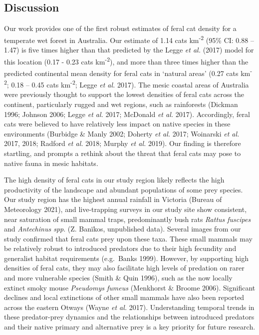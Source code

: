 \documentclass[11pt,a4paper,titlepage,twoside,openright]{style/unimelbthesis}
\begin{document}
\begin{mainmatter}
{\section{Discussion}\label{discussion}}

Our work provides one of the first robust estimates of feral cat density for a temperate wet forest in Australia. Our estimate of 1.14 cats km\textsuperscript{-2} (95\% CI: 0.88 -- 1.47) is five times higher than that predicted by the Legge \emph{et al.} (2017) model for this location (0.17 - 0.23 cats km\textsuperscript{-2}), and more than three times higher than the predicted continental mean density for feral cats in `natural areas' (0.27 cats km\textsuperscript{-2}; 0.18 -- 0.45 cats km\textsuperscript{-2}; Legge \emph{et al.} 2017). The mesic coastal areas of Australia were previously thought to support the lowest densities of feral cats across the continent, particularly rugged and wet regions, such as rainforests (Dickman 1996; Johnson 2006; Legge \emph{et al.} 2017; McDonald \emph{et al.} 2017). Accordingly, feral cats were believed to have relatively less impact on native species in these environments (Burbidge \& Manly 2002; Doherty \emph{et al.} 2017; Woinarski \emph{et al.} 2017, 2018; Radford \emph{et al.} 2018; Murphy \emph{et al.} 2019). Our finding is therefore startling, and prompts a rethink about the threat that feral cats may pose to native fauna in mesic habitats.

The high density of feral cats in our study region likely reflects the high productivity of the landscape and abundant populations of some prey species. Our study region has the highest annual rainfall in Victoria (Bureau of Meteorology 2021), and live-trapping surveys in our study site show consistent, near saturation of small mammal traps, predominantly bush rats \emph{Rattus fuscipes} and \emph{Antechinus spp}. (Z. Banïkos, unpublished data). Several images from our study confirmed that feral cats prey upon these taxa. These small mammals may be relatively robust to introduced predators due to their high fecundity and generalist habitat requirements (e.g.~Banks 1999). However, by supporting high densities of feral cats, they may also facilitate high levels of predation on rarer and more vulnerable species (Smith \& Quin 1996), such as the now locally extinct smoky mouse \emph{Pseudomys fumeus} (Menkhorst \& Broome 2006). Significant declines and local extinctions of other small mammals have also been reported across the eastern Otways (Wayne \emph{et al.} 2017). Understanding temporal trends in these predator-prey dynamics and the relationships between introduced predators and their native primary and alternative prey is a key priority for future research.


\end{mainmatter}
\end{document}
